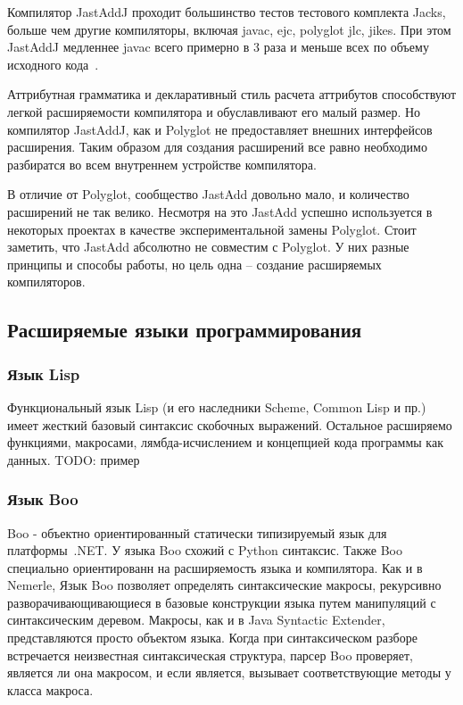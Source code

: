 \documentclass[a4paper,12pt]{article}
\begin{document}
Компилятор JastAddJ проходит большинство тестов тестового комплекта Jacks,
больше чем другие компиляторы, включая javac, ejc, polyglot jlc, jikes. При
этом JastAddJ медленнее javac всего примерно в 3 раза и меньше всех по объему
исходного кода~\cite{JastAddJ}.

Аттрибутная грамматика и декларативный стиль расчета аттрибутов способствуют
легкой расширяемости компилятора и обуславливают его малый размер. Но
компилятор JastAddJ, как и Polyglot не предоставляет внешних интерфейсов
расширения. Таким образом для создания расширений все равно необходимо
разбиратся во всем внутреннем устройстве компилятора.

В отличие от Polyglot, сообщество JastAdd довольно мало, и количество
расширений не так велико. Несмотря на это JastAdd успешно используется в
некоторых проектах в качестве экспериментальной замены Polyglot. Стоит
заметить, что JastAdd абсолютно не совместим с Polyglot. У них разные принципы
и способы работы, но цель одна -- создание расширяемых компиляторов.

\subsection{Расширяемые языки программирования}

\subsubsection{Язык Lisp}
\label{lisp}
Функциональный язык Lisp (и его наследники Scheme, Common Lisp и пр.) имеет
жесткий базовый синтаксис скобочных выражений. Остальное расширяемо функциями,
макросами, лямбда-исчислением и концепцией кода программы как данных.
TODO: пример

\subsubsection{Язык Boo}
Boo - объектно ориентированный статически типизируемый язык для платформы~.NET.
У языка Boo схожий с Python синтаксис. Также Boo специально ориентированн на
расширяемость языка и компилятора. Как и в Nemerle, Язык Boo позволяет
определять синтаксические макросы, рекурсивно разворачивающивающиеся в базовые
конструкции языка путем манипуляций с синтаксическим деревом. Макросы, как и в
Java Syntactic Extender, представляются просто объектом языка. Когда при
синтаксическом разборе встречается неизвестная синтаксическая структура, парсер
Boo проверяет, является ли она макросом, и если является, вызывает
соответствующие методы у класса макроса.
\end{document}
